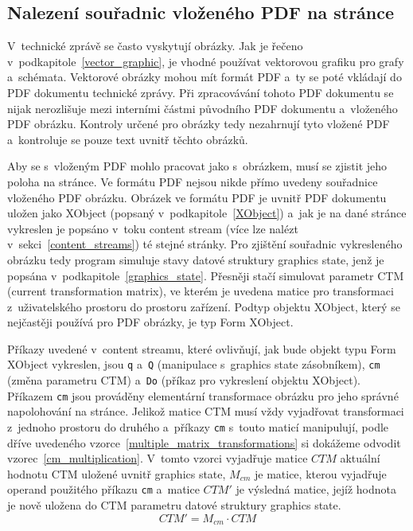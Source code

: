 \noindent\begin{minipage}{\linewidth}
    \hfill
    
\end{minipage}
 

\subsection*{Nalezení souřadnic vloženého PDF na stránce}
V~technické zprávě se často vyskytují obrázky. Jak je řečeno 
v~podkapitole~\ref{vector_graphic}, je vhodné používat vektorovou grafiku
pro grafy a~schémata. Vektorové obrázky mohou mít formát PDF a~ty se poté
vkládají do PDF dokumentu technické zprávy. Při zpracovávání tohoto PDF dokumentu
se nijak nerozlišuje mezi interními částmi původního PDF dokumentu a~vloženého
PDF obrázku. Kontroly určené pro obrázky tedy nezahrnují tyto vložené PDF
a~kontroluje se pouze text uvnitř těchto obrázků.

Aby se s~vloženým PDF mohlo pracovat jako s~obrázkem, musí se zjistit
jeho poloha na stránce. Ve formátu PDF nejsou nikde přímo uvedeny souřadnice
vloženého PDF obrázku. Obrázek ve formátu PDF je uvnitř PDF dokumentu uložen
jako XObject (popsaný v~podkapitole~\ref{XObject}) a~jak je na dané stránce
vykreslen je popsáno v~toku content stream (více lze nalézt
v~sekci~\ref{content_streams}) té stejné stránky.
Pro zjištění souřadnic vykresleného obrázku tedy program simuluje
stavy datové struktury graphics state, jenž je popsána
v~podkapitole~\ref{graphics_state}. Přesněji stačí simulovat parametr
CTM (current transformation matrix), ve kterém je uvedena matice pro transformaci
z~uživatelského prostoru do prostoru zařízení. Podtyp objektu XObject, který se
nejčastěji používá pro PDF obrázky, je typ Form XObject.

Příkazy uvedené
v~content streamu, které ovlivňují, jak bude objekt typu Form XObject vykreslen,
jsou \texttt{q} a~\texttt{Q} (manipulace s~graphics state zásobníkem),
\texttt{cm} (změna parametru CTM) a~\texttt{Do} (příkaz pro vykreslení
objektu XObject). Příkazem \texttt{cm} jsou prováděny elementární transformace
obrázku pro jeho správné napolohování na stránce. Jelikož matice CTM musí vždy
vyjadřovat transformaci z~jednoho prostoru do druhého a~příkazy \texttt{cm}
s~touto maticí manipulují, podle dříve uvedeného
vzorce~\eqref{multiple_matrix_transformations} si dokážeme odvodit
vzorec~\eqref{cm_multiplication}. V~tomto vzorci vyjadřuje matice $CTM$
aktuální hodnotu CTM uložené uvnitř graphics state, $M_{cm}$ 
je matice, kterou vyjadřuje operand použitého příkazu \texttt{cm}
a~matice $CTM'$ je výsledná matice, jejíž hodnota je nově uložena do
CTM parametru datové struktury graphics state.
\begin{equation} \label{cm_multiplication}
    CTM' = M_{cm} \cdot CTM
\end{equation}

